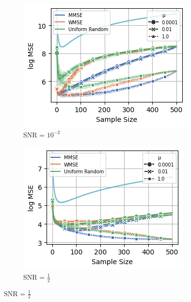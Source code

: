 \begin{figure}%
    \centering
    \begin{subfigure}{0.3\columnwidth}
    \includegraphics[width=\columnwidth]{figures/proj1/plots/GLR_MSE/BA_3_500_bandwidth_50_SNRdbs_-20.0_samps_500_mus_0.0001_0.01_1_bl_noise.png}
    \caption{SNR = $10^{-2}$}
    \label{bandlimited_GLR_BA_MSE_subfiga}
    \end{subfigure}\hfill
    \begin{subfigure}{0.3\columnwidth}
    \includegraphics[width=\columnwidth]{figures/proj1/plots/GLR_MSE/BA_3_500_bandwidth_50_SNRdbs_-3.01_samps_500_mus_0.0001_0.01_1_full_band.png}
    \caption{SNR = $\frac{1}{2}$}%
    \label{bandlimited_GLR_BA_MSE_subfigb}%

\end{subfigure}
\end{figure}
